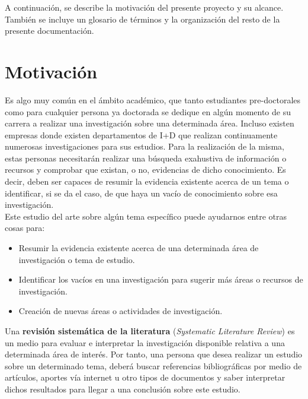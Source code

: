 

A continuación, se describe la motivación del presente proyecto y su alcance. También se incluye un glosario de términos y la organización del resto de la presente documentación.

\section{Motivación}
Es algo muy común en el ámbito académico, que tanto estudiantes pre-doctorales como para cualquier persona ya doctorada se dedique en algún momento de su carrera a realizar una investigación sobre una determinada área. Incluso existen empresas donde existen departamentos de I+D que realizan continuamente numerosas investigaciones para sus estudios. Para la realización de la misma, estas personas necesitarán realizar una búsqueda exahustiva de información o recursos y comprobar que existan, o no, evidencias de dicho conocimiento. Es decir, deben ser capaces de resumir la evidencia existente acerca de un tema o identificar, si se da el caso, de que haya un vacío de conocimiento sobre esa investigación.\\

Este estudio del arte sobre algún tema específico puede ayudarnos entre otras cosas para:

\begin{itemize}
\item Resumir la evidencia existente acerca de una determinada área de investigación o tema de estudio.
\item Identificar los vacíos en una investigación para sugerir más áreas o recursos de investigación.
\item Creación de nuevas áreas o actividades de investigación.
\end{itemize}

Una \textbf{revisión sistemática de la literatura} (\textit{Systematic Literature Review}) es un medio para evaluar e interpretar la investigación disponible relativa a una determinada área de interés. Por tanto, una persona que desea realizar un estudio sobre un determinado tema, deberá buscar referencias bibliográficas por medio de artículos, aportes vía internet u otro tipos de documentos y saber interpretar dichos resultados para llegar a una conclusión sobre este estudio.\\

